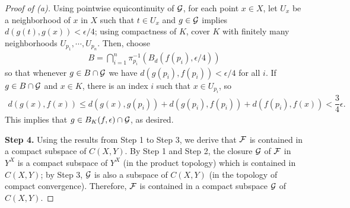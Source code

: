 \begin{proof}[Proof of (a)]
    Using pointwise equicontinuity of ${\mathcal{G}}$, for each point $x\in X$, let $U_x$ be a neighborhood of $x$ in $X$ such that $t\in U_x$ and $g\in{\mathcal{G}}$ implies $d(g(t), g(x))<\epsilon/4$; using compactness of $K$, cover $K$ with finitely many neighborhoods $U_{p_1}, \cdots, U_{p_n}$.
    Then, choose
    \begin{align*}
        B=\bigcap_{i=1}^n \pi_{p_i}^{-1}(B_d(f(p_i), \epsilon/4))
    \end{align*}
    so that whenever $g\in B\cap{\mathcal{G}}$ we have $d(g(p_i), f(p_i))<\epsilon/4$ for all $i$.
    If $g\in B\cap{\mathcal{G}}$ and $x\in K$, there is an index $i$ such that $x\in U_{p_i}$, so
    \begin{align*}
        d(g(x), f(x))\leq d(g(x), g(p_i))+d(g(p_i), f(p_i))+d(f(p_i), f(x))<\dfrac{3}{4}\epsilon.
    \end{align*}
    This implies that $g\in B_K(f, \epsilon)\cap{\mathcal{G}}$, as desired.

    \textbf{Step 4.}
    Using the results from Step 1 to Step 3, we derive that ${\mathcal{F}}$ is contained in a compact subspace of $C(X, Y)$.
    By Step 1 and Step 2, the closure ${\mathcal{G}}$ of ${\mathcal{F}}$ in $Y^X$ is a compact subspace of $Y^X$ (in the product topology) which is contained in $C(X, Y)$; by Step 3, ${\mathcal{G}}$ is also a subspace of $C(X, Y)$ (in the topology of compact convergence).
    Therefore, ${\mathcal{F}}$ is contained in a compact subspace ${\mathcal{G}}$ of $C(X, Y)$.
\end{proof}
